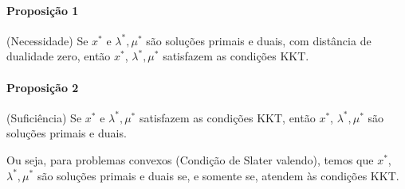\paragraph{Proposição 1} (Necessidade) Se $x^*$ e $\lambda^*,\mu^*$ são soluções primais e duais, com distância de dualidade zero, então $x^*$, $\lambda^*,\mu^*$ satisfazem as condições KKT.

\paragraph{Proposição 2} (Suficiência) Se $x^*$ e $\lambda^*,\mu^*$ satisfazem as condições KKT, então $x^*$, $\lambda^*,\mu^*$ são soluções primais e duais.

Ou seja, para problemas convexos (Condição de Slater valendo), temos que $x^*$, $\lambda^*,\mu^*$ são soluções primais e duais se, e somente se, atendem às condições KKT.

